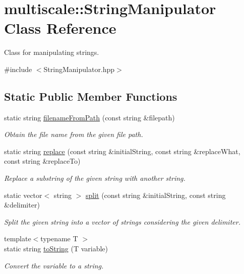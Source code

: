 \hypertarget{classmultiscale_1_1StringManipulator}{\section{multiscale\-:\-:\-String\-Manipulator \-Class \-Reference}
\label{classmultiscale_1_1StringManipulator}
}


\-Class for manipulating strings.  




{\ttfamily \#include $<$\-String\-Manipulator.\-hpp$>$}

\subsection*{\-Static \-Public \-Member \-Functions}
\begin{DoxyCompactItemize}
\item 
static string \hyperlink{classmultiscale_1_1StringManipulator_ab0354ab5ca48df4394695445fe105640}{filename\-From\-Path} (const string \&filepath)
\begin{DoxyCompactList}\small\item\em \-Obtain the file name from the given file path. \end{DoxyCompactList}\item 
static string \hyperlink{classmultiscale_1_1StringManipulator_afe65f4f4cdf70976df2a8749b9e2fc7b}{replace} (const string \&initial\-String, const string \&replace\-What, const string \&replace\-To)
\begin{DoxyCompactList}\small\item\em \-Replace a substring of the given string with another string. \end{DoxyCompactList}\item 
static vector$<$ string $>$ \hyperlink{classmultiscale_1_1StringManipulator_a899c72a05bbd8fb525f31bca3c1ec3c4}{split} (const string \&initial\-String, const string \&delimiter)
\begin{DoxyCompactList}\small\item\em \-Split the given string into a vector of strings considering the given delimiter. \end{DoxyCompactList}\item 
{\footnotesize template$<$typename T $>$ }\\static string \hyperlink{classmultiscale_1_1StringManipulator_a91858c4faa5ee210a9b67e4885835368}{to\-String} (\-T variable)
\begin{DoxyCompactList}\small\item\em \-Convert the variable to a string. \end{DoxyCompactList}\end{DoxyCompactItemize}
